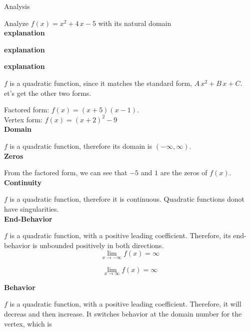 \documentclass{ximera}
\begin{document}
\begin{example}   
Analysis


Analyze $f(x) = x^2 + 4 \, x - 5$ with its natural domain    \\ 




\textbf{explanation}

\textbf{\textcolor{red!75!green}{explanation}} 

\textbf{\textcolor{red!75}{explanation}} 


$f$ is a quadratic function, since it matches the standard form, $A \, x^2 + B \, x + C$. \\


et's get the other two forms.

Factored form: $f(x) = (x+5)(x-1)$. \\

Vertex form: $f(x) = (x+2)^2 - 9$ \\




\textbf{Domain}

$f$ is a quadratic function, therefore its domain is $(-\infty, \infty)$. \\



\textbf{Zeros}

From the factored form, we can see that $-5$ and $1$ are the zeros of $f(x)$.  \\


\textbf{Continuity}

$f$ is a quadratic function, therefore it is continuous. Quadratic functions donot have singularities.\\



\textbf{End-Behavior}

$f$ is a quadratic function, with a positive leading coefficient. Therefore, its end-behavior is unbounded positively in both directions. \\

\[
\lim\limits_{x \to -\infty} f(x) = \infty 
\]


\[
\lim\limits_{x \to \infty} f(x) = \infty 
\]




\textbf{Behavior}

$f$ is a quadratic function, with a positive leading coefficient. Therefore, it will decreas and then increase. It switches behavior at the domain number for the vertex, which is



\end{example}
\end{document}
